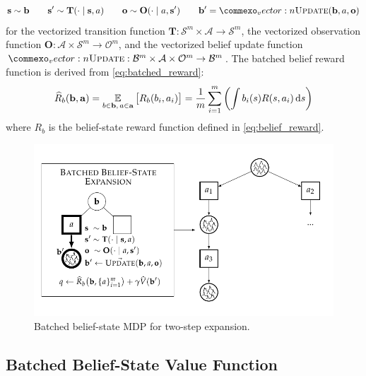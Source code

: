 \begin{equation}
    \mathbf{s} \sim \mathbf{b} \qquad \mathbf{s}' \sim \mathbf{T}(\cdot \mid \mathbf{s}, a) \qquad \mathbf{o} \sim \mathbf{O}(\cdot \mid a, \mathbf{s}') \qquad \mathbf{b}' = \oldvec{\textsc{Update}}(\mathbf{b}, a, \mathbf{o})    
\end{equation}
for the vectorized transition function $\mathbf{T}: \mathcal{S}^m \times \mathcal{A} \to \mathcal{S}^m$, the vectorized observation function $\mathbf{O}: \mathcal{A} \times \mathcal{S}^m \to \mathcal{O}^m$, and the vectorized belief update function $\oldvec{\textsc{Update}}: \mathcal{B}^m \times \mathcal{A} \times \mathcal{O}^m \to \mathcal{B}^m$.
The batched belief reward function is derived from \cref{eq:batched_reward}:
\begin{align}
    \widehat{R}_b(\mathbf{b}, \mathbf{a}) = \operatorname*{\mathbb{E}}_{b \in \mathbf{b},\, a \in \mathbf{a}} \big[ R_b(b_i, a_i) \big] = \frac{1}{m}\sum_{i=1}^m \left( \int b_i(s) R(s,a_i) \mathop{}\!\mathrm{d} s \right)
\end{align}
where $R_b$ is the belief-state reward function defined in \cref{eq:belief_reward}.


\begin{figure}[t]
    \centering
    \includegraphics[width=0.75\linewidth]{diagrams/bbmdp/bbmdp.pdf}
    \caption{Batched belief-state MDP for two-step expansion.}
    \label{fig:bbmdp_expansion}
\end{figure}

\subsection{Batched Belief-State Value Function}

